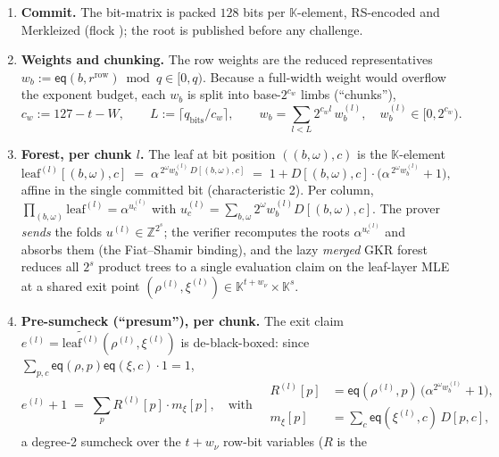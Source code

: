 \documentclass[11pt]{article}
\newcommand{\Z}{\mathbb{Z}}
\newcommand{\K}{\mathbb{K}}            %
\newcommand{\mle}[1]{\widetilde{#1}}
\newcommand{\eq}{\mathsf{eq}}
\newcommand{\cw}{c_w}
\theoremstyle{plain}
\theoremstyle{definition}
\theoremstyle{remark}
\begin{document}
\begin{enumerate}[leftmargin=1.8em,itemsep=2pt]
\item \textbf{Commit.} The bit-matrix is packed $128$ bits per $\K$-element,
  RS-encoded and Merkleized (flock \cite{Flock}); the root is published
  before any challenge.
\item \textbf{Weights and chunking.} The row weights are the reduced
  representatives $w_b := \eq(b,r^{\mathrm{row}}) \bmod q \in [0,q)$. Because a
  full-width weight would overflow the exponent budget, each $w_b$ is split
  into base-$2^{\cw}$ limbs (``chunks''),
  \begin{equation}\label{eq:chunk}
    \cw := 127 - t - W, \qquad
    L := \lceil q_{\mathrm{bits}}/\cw\rceil, \qquad
    w_b = \sum_{l<L} 2^{\cw l}\, w_b^{(l)}, \quad w_b^{(l)}\in[0,2^{\cw}) .
  \end{equation}
\item \textbf{Forest, per chunk $l$.} The leaf at bit position
  $((b,\omega),c)$ is the $\K$-element
  \begin{equation}\label{eq:baseleaf}
    \mathrm{leaf}^{(l)}[(b,\omega),c]
    \;=\; \alpha^{\,2^{\omega} w_b^{(l)}\, D[(b,\omega),c]}
    \;=\; 1 + D[(b,\omega),c]\cdot\bigl(\alpha^{\,2^{\omega} w_b^{(l)}}+1\bigr),
  \end{equation}
  affine in the single committed bit (characteristic 2). Per column,
  $\prod_{(b,\omega)}\mathrm{leaf}^{(l)} = \alpha^{u_c^{(l)}}$ with
  $u_c^{(l)} = \sum_{b,\omega} 2^{\omega} w_b^{(l)} D[(b,\omega),c]$. The
  prover \emph{sends} the folds $u^{(l)}\in\Z^{2^{s}}$; the verifier
  recomputes the roots $\alpha^{u_c^{(l)}}$ and absorbs them (the
  Fiat--Shamir binding), and the lazy \emph{merged} GKR forest reduces all
  $2^{s}$ product trees to a single evaluation claim on the leaf-layer MLE at
  a shared exit point $(\rho^{(l)},\xi^{(l)})\in\K^{t+w_\nu}\times\K^{s}$.
\item \textbf{Pre-sumcheck (``presum''), per chunk.} The exit claim
  $e^{(l)}=\mle{\mathrm{leaf}^{(l)}}(\rho^{(l)},\xi^{(l)})$ is de-black-boxed:
  since $\sum_{p,c}\eq(\rho,p)\eq(\xi,c)\cdot 1 = 1$,
  \[
    e^{(l)} + 1 \;=\; \sum_{p} R^{(l)}[p]\cdot m_\xi[p],
    \quad\text{with}\quad
    \begin{aligned}
      R^{(l)}[p] &= \eq(\rho^{(l)},p)\,\bigl(\alpha^{2^{\omega}w^{(l)}_b}+1\bigr),\\
      m_\xi[p] &= \textstyle\sum_{c}\eq(\xi^{(l)},c)\,D[p,c],
    \end{aligned}
  \]
  a degree-2 sumcheck over the $t+w_\nu$ row-bit variables ($R$ is the

\end{enumerate}
\end{document}
